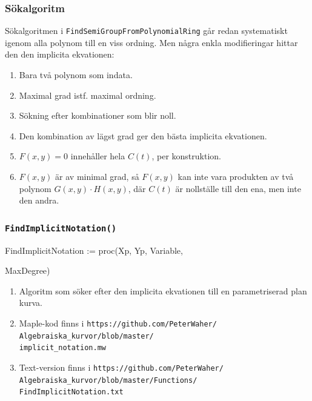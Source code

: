 \documentclass{beamer}
\begin{document}
\begin{frame}
	\frametitle{Sökalgoritm}
	
	Sökalgoritmen i \texttt{FindSemiGroupFromPolynomialRing} går redan systematiskt igenom alla polynom till en viss ordning. Men några enkla modifieringar hittar den den implicita ekvationen:
	
	\begin{enumerate}
		\item<2->Bara två polynom som indata.
		\item<3->Maximal grad istf. maximal ordning.
		\item<4->Sökning efter kombinationer som blir noll.
		\item<5->Den kombination av lägst grad ger den bästa implicita ekvationen.
		\item<6->$F(x,y)=0$ innehåller hela $C(t)$, per konstruktion.
		\item<7->$F(x,y)$ är av minimal grad, så $F(x,y)$ kan inte vara produkten av två polynom $G(x,y)\cdot H(x,y)$, där $C(t)$ är nollställe till den ena, men inte den andra.
	\end{enumerate}
\end{frame}

\begin{frame}
	\frametitle{\texttt{FindImplicitNotation()}}
	
	\begin{semiverbatim}
		FindImplicitNotation := proc(Xp, Yp, Variable,

\qquad MaxDegree)
	\end{semiverbatim}
	
	\begin{enumerate}
		\item<1-> Algoritm som söker efter den implicita ekvationen till en parametriserad plan kurva.
		
		\item<2-> Maple-kod finns i
		\texttt{https://github.com/PeterWaher/\\
			\qquad Algebraiska\_kurvor/blob/master/\\
			\qquad implicit\_notation.mw}

		\item<3-> Text-version finns i
		\texttt{https://github.com/PeterWaher/\\
			\qquad Algebraiska\_kurvor/blob/master/Functions/\\
			\qquad FindImplicitNotation.txt} 
	\end{enumerate}
\end{frame}
\end{document}
